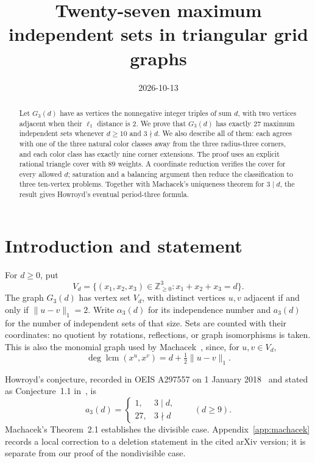 \documentclass[11pt]{article}
\title{Twenty-seven maximum independent sets in triangular grid graphs}
\author{}
\date{2026-10-13}
\newcommand{\N}{\mathbb Z_{\geq 0}}
\begin{document}
\maketitle

\begin{abstract}
Let \(G_3(d)\) have as vertices the nonnegative integer triples of sum
\(d\), with two vertices adjacent when their \(\ell_1\) distance is \(2\).
We prove that \(G_3(d)\) has exactly \(27\) maximum independent sets
whenever \(d\geq10\) and \(3\nmid d\). We also describe all of them:
each agrees with one of the three natural color classes away from
the three radius-three corners, and each color class has exactly nine
corner extensions. The proof uses an explicit rational triangle cover
with \(89\) weights. A coordinate reduction verifies the cover for every
allowed \(d\); saturation and a balancing argument then reduce the
classification to three ten-vertex problems. Together with Machacek's
uniqueness theorem for \(3\mid d\), the result gives Howroyd's eventual
period-three formula.
\end{abstract}

\section{Introduction and statement}\label{sec:intro}

For \(d\geq0\), put
\[
 V_d=\{(x_1,x_2,x_3)\in\N^3:x_1+x_2+x_3=d\}.
\]
The graph \(G_3(d)\) has vertex set \(V_d\), with distinct vertices \(u,v\)
adjacent if and only if \(\|u-v\|_1=2\).
Write \(\alpha_3(d)\) for its independence number and \(a_3(d)\) for the
number of independent sets of that size. Sets are counted with their
coordinates: no quotient by rotations, reflections, or graph
isomorphisms is taken. This is also the monomial graph used by
Machacek~\cite{machacek}, since, for \(u,v\in V_d\),
\[
 \deg\operatorname{lcm}(x^u,x^v)
   =d+\tfrac12\|u-v\|_1.
\]

Howroyd's conjecture, recorded in OEIS A297557 on 1 January
2018~\cite{oeis} and stated as Conjecture~1.1
in~\cite{machacek}, is
\begin{equation}\label{eq:howroyd}
 a_3(d)=
 \begin{cases}
  1,&3\mid d,\\
  27,&3\nmid d
 \end{cases}
 \qquad(d\geq9).
\end{equation}
Machacek's Theorem~2.1 establishes the divisible case.
Appendix~\ref{app:machacek} records a local correction to a deletion
statement in the cited arXiv version; it is separate from our proof of
the nondivisible case.
\end{document}
